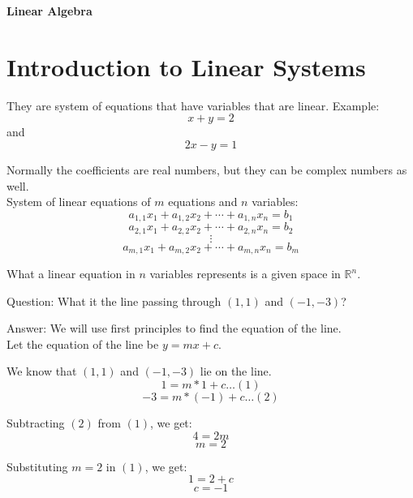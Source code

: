 \documentclass{article}
\begin{document}
\begin{center}
    \begin{LARGE}
        \textbf{Linear Algebra}
    \end{LARGE}
\end{center}

\section{Introduction to Linear Systems}
They are system of equations that have variables that are linear.
Example: \[x + y = 2\] and \[2x - y = 1\]

Normally the coefficients are real numbers, but they can be complex numbers as well. \\[1pt]
System of linear equations of $m$ equations and $n$ variables:
    \[
    a_{1,1} x_1 + a_{1,2} x_2 + \cdots + a_{1,n} x_n = b_1
    \]
    \[
    a_{2,1} x_1 + a_{2,2} x_2 + \cdots + a_{2,n} x_n = b_2
    \]
    \[
    \vdots
    \]
    \[
    a_{m,1} x_1 + a_{m,2} x_2 + \cdots + a_{m,n} x_n = b_m
    \]

What a linear equation in $n$ variables represents is a given space in $\mathbb{R}^n$.

\begin{paragraph}{Question:}
What it the line passing through $(1,1)$ and $(-1,-3)$?
\end{paragraph}     
\begin{paragraph}{Answer:}
    We will use first principles to find the equation of the line.\\[1pt]
    Let the equation of the line be $y = mx + c$.
    
    We know that $(1,1)$ and $(-1,-3)$ lie on the line.\\[1pt]
    \[1 = m*1 + c \dots (1)\]
    \[-3 = m*(-1) + c \dots (2)\]

    Subtracting $(2)$ from $(1)$, we get:
    \[4 = 2m\]
    \[m = 2\]

    Substituting $m = 2$ in $(1)$, we get:
    \[1 = 2 + c\]
    \[c = -1\]
    
\end{paragraph}
\end{document}
